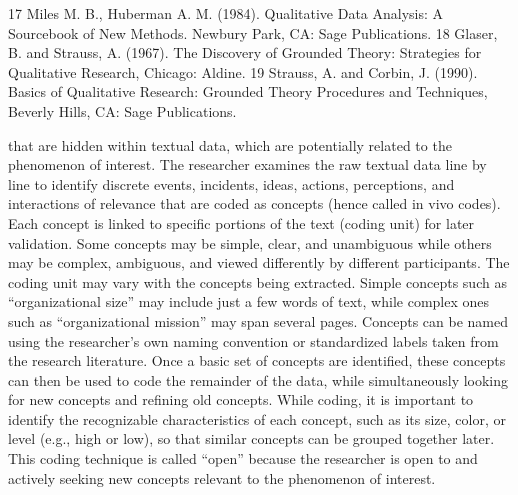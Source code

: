 17 Miles M. B., Huberman A. M. (1984). Qualitative Data Analysis: A Sourcebook of New Methods. Newbury Park, CA: Sage Publications. 18 Glaser, B. and Strauss, A. (1967). The Discovery of Grounded Theory: Strategies for Qualitative Research, Chicago: Aldine. 19 Strauss, A. and Corbin, J. (1990). Basics of Qualitative Research: Grounded Theory Procedures and Techniques, Beverly Hills, CA: Sage Publications.

that are hidden within textual data, which are potentially related to the phenomenon of interest. The researcher examines the raw textual data line by line to identify discrete events, incidents, ideas, actions, perceptions, and interactions of relevance that are coded as concepts (hence called in vivo codes). Each concept is linked to specific portions of the text (coding unit) for later validation. Some concepts may be simple, clear, and unambiguous while others may be complex, ambiguous, and viewed differently by different participants. The coding unit may vary with the concepts being extracted. Simple concepts such as “organizational size” may include just a few words of text, while complex ones such as “organizational mission” may span several pages. Concepts can be named using the researcher’s own naming convention or standardized labels taken from the research literature. Once a basic set of concepts are identified, these concepts can then be used to code the remainder of the data, while simultaneously looking for new concepts and refining old concepts. While coding, it is important to identify the recognizable characteristics of each concept, such as its size, color, or level (e.g., high or low), so that similar concepts can be grouped together later. This coding technique is called “open” because the researcher is open to and actively seeking new concepts relevant to the phenomenon of interest.


